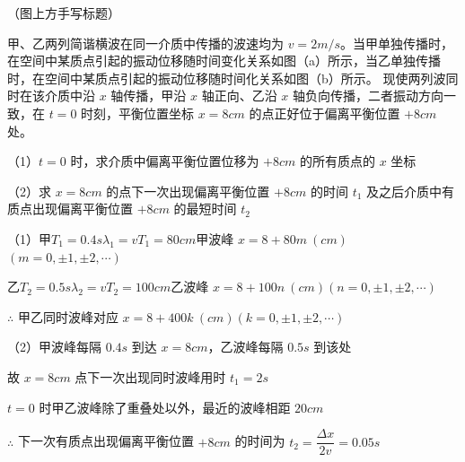 （图上方手写标题）


\begin{problem}[19.（6分）]
甲、乙两列简谐横波在同一介质中传播的波速均为 $v=2\unit{m/s}$。当甲单独传播时，在空间中某质点引起的振动位移随时间变化关系如图（a）所示，当乙单独传播时，在空间中某质点引起的振动位移随时间化关系如图（b）所示。%
现使两列波同时在该介质中沿 $x$ 轴传播，甲沿 $x$ 轴正向、乙沿 $x$ 轴负向传播，二者振动方向一致，在 $t=0$ 时刻，平衡位置坐标 $x=8\unit{cm}$ 的点正好位于偏离平衡位置 $+8\unit{cm}$ 处。

（1）$t=0$ 时，求介质中偏离平衡位置位移为 $+8\unit{cm}$ 的所有质点的 $x$ 坐标

（2）求 $x=8\unit{cm}$ 的点下一次出现偏离平衡位置 $+8\unit{cm}$ 的时间 $t_1$ 及之后介质中有质点出现偏离平衡位置 $+8\unit{cm}$ 的最短时间 $t_2$

\begin{solution}

（1）甲\quad $T_1=0.4\unit{s}$\quad $\lambda_1=vT_1=80\unit{cm}$\quad 甲波峰 $x=8+80m\ (\unit{cm})$\quad $(m=0,\pm1,\pm2,\cdots)$

\hspace{1.6em}乙\quad $T_2=0.5\unit{s}$\quad $\lambda_2=vT_2=100\unit{cm}$\quad 乙波峰 $x=8+100n\ (\unit{cm})$\quad $(n=0,\pm1,\pm2,\cdots)$

\hspace{1.6em}$\therefore$ 甲乙同时波峰对应 $x=8+400k\ (\unit{cm})$\quad $(k=0,\pm1,\pm2,\cdots)$

（2）甲波峰每隔 $0.4\unit{s}$ 到达 $x=8\unit{cm}$，乙波峰每隔 $0.5\unit{s}$ 到该处

\hspace{1.6em}故 $x=8\unit{cm}$ 点下一次出现同时波峰用时 $t_1=2\unit{s}$

\hspace{1.6em}$t=0$ 时甲乙波峰除了重叠处以外，最近的波峰相距 $20\unit{cm}$

\hspace{1.6em}$\therefore$ 下一次有质点出现偏离平衡位置 $+8\unit{cm}$ 的时间为 $t_2=\dfrac{\Delta x}{2v}=0.05\unit{s}$
\end{solution}
\end{problem}
